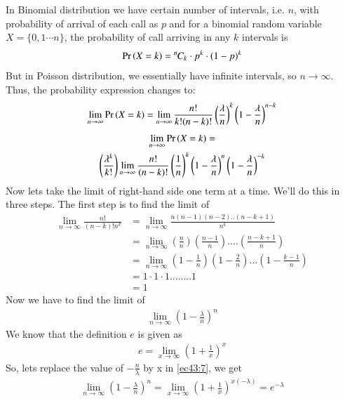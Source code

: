 In Binomial distribution we have certain number of intervals, i.e. $n$, with probability of arrival of each call as $p$ and for a binomial random variable $X=\{0,1\cdots n\}$, the probability of call arriving in any $k$ intervals is 
\begin{align}
    \Pr\left(X=k\right)={{}^{n}\mkern-1muC_{k}}\cdot p^k\cdot(1-p)^k
\end{align} But in Poisson distribution, we essentially have infinite intervals, so $n\rightarrow\infty$. Thus, the probability expression changes to:
\begin{align}
   \lim_{n \to \infty}\Pr\left(X=k\right)=\lim_{n \to \infty}\frac{n!}{k!(n-k)!}\left(\frac{\lambda}{n}\right)^k\left(1-\frac{\lambda}{n}\right)^{n-k}
\end{align}
\begin{multline}  \label{ec43:5}
    \lim_{n \to \infty}\pr{X=k}=\\
    \left(\frac{\lambda^k}{k!}\right)\lim_{n \to \infty}\frac{n!}{(n-k)!}\left(\frac{1}{n}\right)^k\left(1-\frac{\lambda}{n}\right)^n\left(1-\frac{\lambda}{n}\right)^{-k}
\end{multline}
Now lets take the limit of right-hand side one term at a time. We’ll do this in three steps. The first step is to find the limit of 
\begin{equation}
\begin{split}\label{ec43:6}
     \lim_{n \to \infty}\frac{n!}{(n-k)!n^k}
     &= \lim_{n \to \infty}\frac{n(n-1)(n-2)..(n-k+1)}{n^k}\\
    & = \lim_{n \to\infty}\left(\frac{n}{n}\right)\left(\frac{n-1}{n}\right)....\left(\frac{n-k+1}{n}\right)\\
   &= \lim_{n \to \infty}\left(1-\frac{1}{n}\right)\left(1-\frac{2}{n}\right)...\left(1-\frac{k-1}{n}\right)\\
    &=1\cdot1\cdot1........1\\
    &=1   
    \end{split}
\end{equation}
Now we have to find the limit of 
\begin{align}\label{ec43:7}
    \lim_{n \to \infty}\left(1-\frac{\lambda}{n}\right)^n 
\end{align}
We know that the definition $e$ is given as 
\begin{align}
    e=\lim_{x \to \infty}\left(1+\frac{1}{x}\right)^x
\end{align}
So, lets replace the value of $-\frac{n}{\lambda}$ by x in \eqref{ec43:7}, we get
\begin{align}\label{ec43:9}
    \lim_{n \to \infty}\left(1-\frac{\lambda}{n}\right)^n =\lim_{x \to \infty}\left(1+\frac{1}{x}\right)^{x(-\lambda)}=e^{-\lambda}
\end{align}
